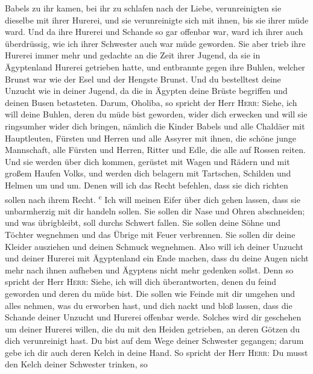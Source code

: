 Babels zu ihr kamen, bei ihr zu schlafen nach der Liebe, verunreinigten
sie dieselbe mit ihrer Hurerei, und sie verunreinigte sich mit ihnen,
bis sie ihrer müde ward.  Und da ihre Hurerei und Schande
so gar offenbar war, ward ich ihrer auch überdrüssig, wie ich ihrer
Schwester auch war müde geworden.  Sie aber trieb ihre
Hurerei immer mehr und gedachte an die Zeit ihrer Jugend, da sie in
Ägyptenland Hurerei getrieben hatte,  und entbrannte
gegen ihre Buhlen, welcher Brunst war wie der Esel und der Hengste
Brunst.  Und du bestelltest deine Unzucht wie in deiner
Jugend, da die in Ägypten deine Brüste begriffen und deinen Busen
betasteten.  Darum, Oholiba, so spricht der Herr
\textsc{Herr}: Siehe, ich will deine Buhlen, deren du müde bist
geworden, wider dich erwecken und will sie ringsumher wider dich
bringen,  nämlich die Kinder Babels und alle Chaldäer mit
Hauptleuten, Fürsten und Herren und alle Assyrer mit ihnen, die schöne
junge Mannschaft, alle Fürsten und Herren, Ritter und Edle, die alle auf
Rossen reiten.  Und sie werden über dich kommen, gerüstet
mit Wagen und Rädern und mit großem Haufen Volks, und werden dich
belagern mit Tartschen, Schilden und Helmen um und um. Denen will ich
das Recht befehlen, dass sie dich richten sollen nach ihrem Recht.
\textsuperscript{c}  Ich will meinen Eifer über dich
gehen lassen, dass sie unbarmherzig mit dir handeln sollen. Sie sollen
dir Nase und Ohren abschneiden; und was übrigbleibt, soll durchs Schwert
fallen. Sie sollen deine Söhne und Töchter wegnehmen und das Übrige mit
Feuer verbrennen.  Sie sollen dir deine Kleider ausziehen
und deinen Schmuck wegnehmen.  Also will ich deiner
Unzucht und deiner Hurerei mit Ägyptenland ein Ende machen, dass du
deine Augen nicht mehr nach ihnen aufheben und Ägyptens nicht mehr
gedenken sollst.  Denn so spricht der Herr \textsc{Herr}:
Siehe, ich will dich überantworten, denen du feind geworden und deren du
müde bist.  Die sollen wie Feinde mit dir umgehen und
alles nehmen, was du erworben hast, und dich nackt und bloß lassen, dass
die Schande deiner Unzucht und Hurerei offenbar werde. 
Solches wird dir geschehen um deiner Hurerei willen, die du mit den
Heiden getrieben, an deren Götzen du dich verunreinigt hast.
 Du bist auf dem Wege deiner Schwester gegangen; darum
gebe ich dir auch deren Kelch in deine Hand.  So spricht
der Herr \textsc{Herr}: Du musst den Kelch deiner Schwester trinken, so
